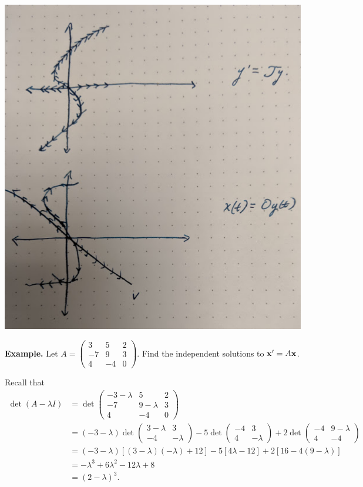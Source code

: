 \documentclass{article}
\newcommand{\mat}[1]{\begin{pmatrix}#1\end{pmatrix}}
\begin{document}
\includegraphics{7-9-1.png}

{\bf Example.} Let $A = \mat{3 & 5 & 2 \\ -7 & 9 & 3 \\ 4 & -4 & 0}$.  Find the independent solutions to $\mathbf{x}' = A \mathbf{x}$.

Recall that
\begin{align*}
  \det(A - \lambda I) &= \det \mat{-3 - \lambda & 5 & 2 \\ -7 & 9-\lambda & 3 \\ 4 & -4 & 0}  \\
  &= (-3 - \lambda) \det \mat{3 - \lambda & 3 \\ -4 & - \lambda} - 5 \det \mat{-4 & 3 \\ 4 & - \lambda} + 2 \det \mat{-4 & 9 - \lambda \\ 4 & -4} \\
  &= (- 3 - \lambda) \left[ (3- \lambda)(- \lambda) + 12 \right] - 5 \left[ 4 \lambda - 12 \right] + 2 \left[ 16 - 4 (9 - \lambda) \right] \\
  &= - \lambda^3 + 6 \lambda^2 - 12 \lambda + 8 \\
  &= (2 - \lambda)^3.
\end{align*}
\end{document}
